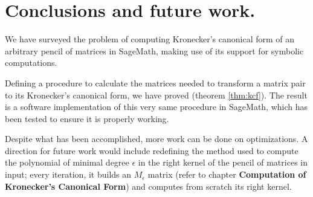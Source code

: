 \section{Conclusions and future work.}
We have surveyed the problem of computing Kronecker's canonical form of an arbitrary pencil of matrices in SageMath,
making use of its support for symbolic computations.

Defining a procedure to calculate the matrices needed to transform a matrix pair to its Kronecker's canonical form,
we have proved  (theorem \ref{thm:kcf}). The result is a software implementation of this very same
procedure in SageMath\cite{Trapani_Computation_of_Kronecker_s}, which has been tested to ensure it is properly working.

Despite what has been accomplished, more work can be done on optimizations. A direction for future work
would include redefining the method used to compute the polynomial of minimal degree \(\epsilon\) in the right kernel of
the pencil of matrices in input; every iteration, it builds an \(M_\epsilon\) matrix (refer to chapter
\textbf{Computation of Kronecker's Canonical Form}) and computes from scratch its right kernel.